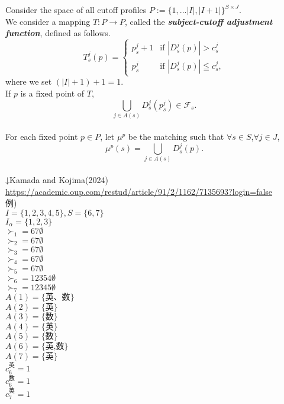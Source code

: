 \documentclass[a4j,10pt]{jsarticle}
\theoremstyle{definition}
\theoremstyle{remark}
\theoremstyle{plain}
\begin{document}
\begin{tcolorbox}[enhanced,breakable=true]

  Consider the space of all cutoff profiles \( P := \{1,...|I|,|I+1|\}^{S \times J} \). \\ 
  We consider a mapping \( T : P \rightarrow P \), called the {\bf \emph{subject-cutoff adjustment function}}, defined as follows.
\[
T_s^j(p) =
\begin{cases}
p_s^j + 1 & \text{if } | D_s^j(p) | > c^j_s \\
p_s^j     & \text{if } | D_s^j(p) | \leqq  c^j_s,
\end{cases}
\]
where we set \( (|I| + 1) + 1 = 1. \)\\

If $p$ is a fixed point of $T$, 
\[
\bigcup_{j \in A(s)} D^j_s(p^j_s) \in \mathcal{F}_s.
\]\\


For each fixed point $p \in P$, let $\mu^{p}$ be the matching such that $\forall s \in S$,$\forall j \in J$,
\[\mu^{p}(s) =\bigcup_{j \in A(s)} D^j_s(p) .
\]\\
↓Kamada and Kojima(2024)\\
\url{https://academic.oup.com/restud/article/91/2/1162/7135693?login=false}\\


例)\\
$I = \{1,2,3,4,5\}, S = \{6,7\}$\\
$I_\alpha = \{1,2,3\}$\\
$\succ_1 = 67\emptyset$\\
$\succ_2 = 67\emptyset$\\
$\succ_3 = 67\emptyset$\\
$\succ_4 = 67\emptyset$\\
$\succ_5 = 67\emptyset$\\
$\succ_6 = 12354\emptyset$\\
$\succ_7 = 12345\emptyset$\\
$A(1) = \{\text{英、数}\}$\\
$A(2) = \{\text{英}\}$\\
$A(3) = \{\text{数}\}$\\
$A(4) = \{\text{英}\}$\\
$A(5) = \{\text{数}\}$\\
$A(6) = \{\text{英,数}\}$\\
$A(7) = \{\text{英}\}$\\
$c_6^{\text{英}} = 1$\\
$c_6^{\text{数}} = 1$\\
$c_7^{\text{英}} = 1$\\


\end{tcolorbox}
\end{document}
